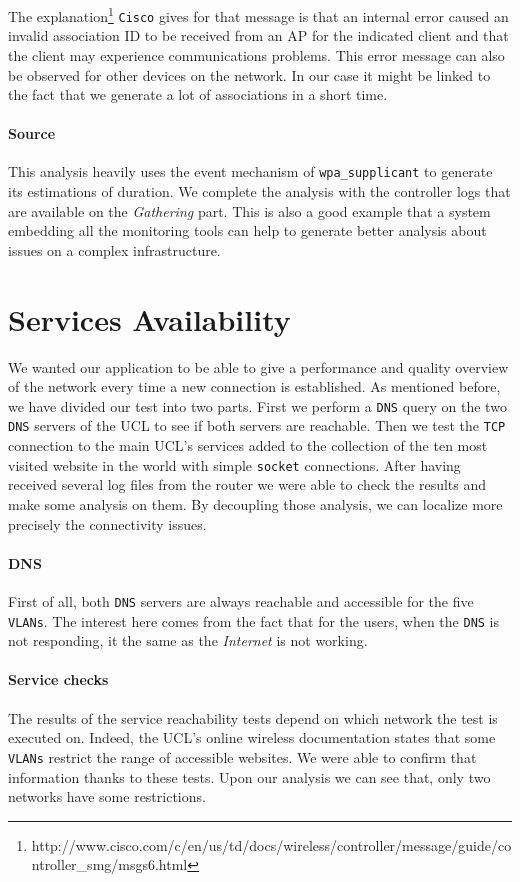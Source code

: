 The explanation\footnote{http://www.cisco.com/c/en/us/td/docs/wireless/controller/message/guide/controller\_smg/msgs6.html} \texttt{Cisco} gives for that message is that an internal error caused an invalid association ID to be received from an AP for the indicated client and that the client may experience communications problems. This error message can also be observed for other devices on the network. In our case it might be linked to the fact that we generate a lot of associations in a short time.

\paragraph*{Source} This analysis heavily uses the event mechanism of \texttt{wpa\_supplicant} to generate its estimations of duration. We complete the analysis with the controller logs that are available on the \emph{Gathering} part. This is also a good example that a system embedding all the monitoring tools can help to generate better analysis about issues on a complex infrastructure.


\section{Services Availability}
We wanted our application to be able to give a performance and quality overview of the network every time a new connection is established. As mentioned before, we have divided our test into two parts. First we perform a \texttt{DNS} query on the two \texttt{DNS} servers of the UCL to see if both servers are reachable. Then we test the \texttt{TCP} connection to the main UCL's services added to the collection of the ten most visited website in the world with simple \texttt{socket} connections. After having received several log files from the router we were able to check the results and make some analysis on them. By decoupling those analysis, we can localize more precisely the connectivity issues.

\paragraph*{DNS} First of all, both \texttt{DNS} servers are always reachable and accessible for the five \texttt{VLANs}. The interest here comes from the fact that for the users, when the \texttt{DNS} is not responding, it the same as the \emph{Internet} is not working. 

\paragraph*{Service checks} The results of the service reachability tests depend on which network the test is executed on. Indeed, the UCL's online wireless documentation states that some \texttt{VLANs} restrict the range of accessible websites. We were able to confirm that information thanks to these tests. Upon our analysis we can see that, only two networks have some restrictions.


